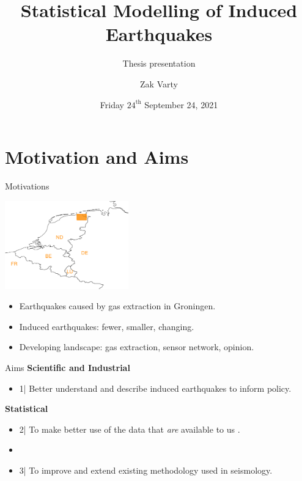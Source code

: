 \documentclass[10pt]{beamer}
\title{Statistical Modelling of Induced Earthquakes}
\subtitle{Thesis presentation}
\date{Friday $24^{\text{th}}$ September 24, 2021}
\author{Zak Varty}
\institute{STOR-i CDT, Lancaster University}
\begin{document}
\maketitle

\section{Motivation and Aims}


\begin{frame}{Motivations}
\begin{center}
\includegraphics[width = 0.4\textwidth]{Groningen_window_europeII.pdf}
\end{center}

\begin{itemize}
    \item Earthquakes caused by gas extraction in Groningen. \\[1em]
\item Induced earthquakes: fewer, smaller, changing. \\[1em] 
\item Developing  landscape: gas extraction, sensor network, opinion.  \\[1em]
\end{itemize}
\end{frame}


\begin{frame}{Aims}
     \textbf{Scientific and Industrial}
     \begin{itemize}
         \item {\large1| } Better understand and describe induced earthquakes to inform policy. 
     \end{itemize}
     
     \vspace{2em}
     
     \textbf{Statistical}
     \begin{itemize}
         \item {\large2| } To make better use of the data that \textit{are} available to us .
         \item[]
         \item {\large3| } To improve and extend existing methodology used in seismology. 
     \end{itemize}
\end{frame} 
\end{document}
